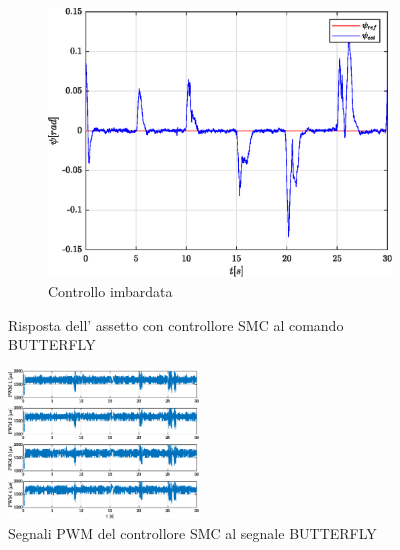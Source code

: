 \begin{figure}
	\hfill
	\begin{subfigure}{0.45\textwidth}
		\centering
		\includegraphics[width=1\textwidth]{Simulazioni/Figure/SMC/BUTTERFLY/AttitudeControlYaw}
		\caption{Controllo imbardata}
		\label{fig:BUTTERFLYyawSMC}
	\end{subfigure}
	\caption{Risposta dell' assetto con controllore SMC al comando BUTTERFLY}
\end{figure}

\begin{figure}
	\centering
	\includegraphics[width=0.45\textwidth]{Simulazioni/Figure/SMC/BUTTERFLY/PWM}
	\caption{Segnali PWM del controllore SMC al segnale BUTTERFLY}
	\label{fig:BUTTERFLYPWMSMC}
\end{figure}

